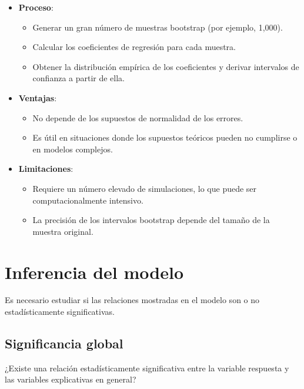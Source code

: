 \documentclass[
  letterpaper,
  DIV=11,
  numbers=noendperiod]{scrreprt}
\providecommand{\tightlist}{%
  \setlength{\itemsep}{0pt}\setlength{\parskip}{0pt}}\usepackage{longtable,booktabs,array}
\begin{document}
\begin{itemize}
\tightlist
\item
  \textbf{Proceso}:

  \begin{itemize}
  \tightlist
  \item
    Generar un gran número de muestras bootstrap (por ejemplo, 1,000).
  \item
    Calcular los coeficientes de regresión para cada muestra.
  \item
    Obtener la distribución empírica de los coeficientes y derivar
    intervalos de confianza a partir de ella.
  \end{itemize}
\item
  \textbf{Ventajas}:

  \begin{itemize}
  \tightlist
  \item
    No depende de los supuestos de normalidad de los errores.
  \item
    Es útil en situaciones donde los supuestos teóricos pueden no
    cumplirse o en modelos complejos.
  \end{itemize}
\item
  \textbf{Limitaciones}:

  \begin{itemize}
  \tightlist
  \item
    Requiere un número elevado de simulaciones, lo que puede ser
    computacionalmente intensivo.
  \item
    La precisión de los intervalos bootstrap depende del tamaño de la
    muestra original.
  \end{itemize}
\end{itemize}

\section{Inferencia del modelo}\label{inferencia-del-modelo}

Es necesario estudiar si las relaciones mostradas en el modelo son o no
estadísticamente significativas.

\subsection{Significancia global}\label{significancia-global}

¿Existe una relación estadísticamente significativa entre la variable
respuesta y las variables explicativas en general?
\end{document}
